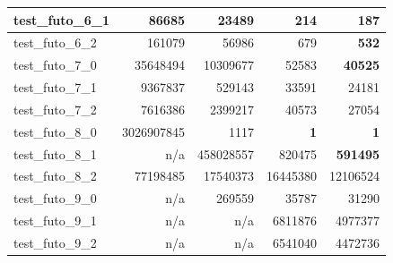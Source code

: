 \documentclass{article}
\begin{document}
\begin{table}[H]
\begin{center}
\begin{tabular}{|l|r|r|r|r|}
				test\_futo\_6\_1 & 86685                            & 23489                            & 214                                  & \textbf{187}                         \\ \hline
				test\_futo\_6\_2 & 161079                           & 56986                            & 679                                  & \textbf{532}                         \\ \hline
				test\_futo\_7\_0 & 35648494                         & 10309677                         & 52583                                & \textbf{40525}                       \\ \hline
				test\_futo\_7\_1 & 9367837                          & 529143                           & 33591                                & 24181                                \\ \hline
				test\_futo\_7\_2 & 7616386                          & 2399217                          & 40573                                & 27054                                \\ \hline
				test\_futo\_8\_0 & 3026907845                       & 1117                             & \textbf{1}                           & \textbf{1}                           \\ \hline
				test\_futo\_8\_1 & n/a                              & 458028557                        & 820475                               & \textbf{591495}                      \\ \hline
				test\_futo\_8\_2 & 77198485                         & 17540373                         & 16445380                             & 12106524                             \\ \hline
				test\_futo\_9\_0 & n/a                              & 269559                           & 35787                                & 31290                                \\ \hline
				test\_futo\_9\_1 & n/a                              & n/a                              & 6811876                              & 4977377                              \\ \hline
				test\_futo\_9\_2 & n/a                              & n/a                              & 6541040                              & 4472736                              \\ \hline
			\end{tabular}
		\end{center}
	\end{table}
	
\end{document}
